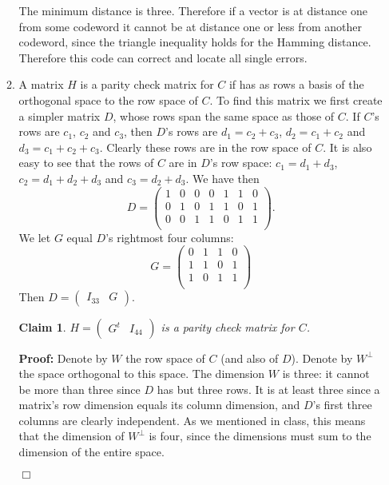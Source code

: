 \documentclass[11pt]{article} \usepackage{amssymb}
\newtheorem{claim}[theorem]{Claim}
\newenvironment{proof}{\noindent \textbf{Proof:}}{$\Box$}
\begin{document}
\begin{enumerate}
\begin{enumerate}
      The minimum distance is three. Therefore if a vector is at distance one
      from some codeword it cannot be at distance one or less from another
      codeword, since the triangle inequality holds for the Hamming distance.
      Therefore this code can correct and locate all single errors.
      
    \item
      A matrix $H$ is a parity check matrix for $C$ if has as rows a basis 
      of the orthogonal
      space to the row space of $C$. To find this matrix we first create a 
      simpler matrix $D$, whose rows span the same space as those of $C$. If $C$'s
      rows are $c_1$, $c_2$ and $c_3$, then $D$'s rows are $d_1=c_2+c_3$, 
      $d_2=c_1+c_2$ and $d_3=c_1+c_2+c_3$. Clearly these rows are in the row 
      space of $C$. It is
      also easy to see that the rows of $C$ are in $D$'s row space:
      $c_1=d_1+d_3$, $c_2=d_1+d_2+d_3$ and $c_3=d_2+d_3$. We have then
      \begin{equation*}
        D=
        \begin{pmatrix}
          1 & 0 & 0 & 0 & 1 & 1 & 0\\
          0 & 1 & 0 & 1 & 1 & 0 & 1\\
          0 & 0 & 1 & 1 & 0 & 1 & 1\\
        \end{pmatrix}.
      \end{equation*}
      We let $G$ equal $D$'s rightmost four columns:
      \begin{equation*}
        G=
        \begin{pmatrix}
          0 & 1 & 1 & 0\\
          1 & 1 & 0 & 1\\
          1 & 0 & 1 & 1\\
        \end{pmatrix}
      \end{equation*}
      Then $D=\begin{pmatrix}I_{33}& G\end{pmatrix}$.

      \begin{claim}
        $H=\begin{pmatrix}G^t & I_{44}\end{pmatrix}$ is a parity check 
        matrix for $C$.
      \end{claim}
      \begin{proof}
        Denote by $W$ the row space of $C$ (and also of $D$). Denote by
        $W^\bot$ the space orthogonal to this space. 
        The dimension $W$ is three: it cannot be more than
        three since $D$ has but three rows. It is at least three since a
        matrix's row dimension equals its column dimension, and $D$'s first
        three columns are clearly independent. As we mentioned in class, this
        means that the dimension of $W^\bot$ is four, since the dimensions
        must sum to the dimension of the entire space.


\end{proof}
\end{enumerate}
\end{enumerate}
\end{document}
